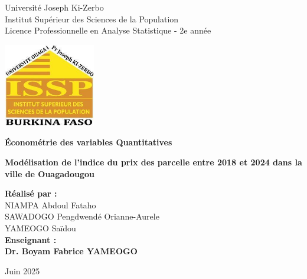 \begin{titlepage}
    \centering
    \vspace{1.5cm}
    {\Large Université Joseph Ki-Zerbo \\ 
    Institut Supérieur des Sciences de la Population \\ 
    Licence Professionnelle en Analyse Statistique - 2e année \par}
    \vspace{1cm}

    \includegraphics[width=4cm]{logo.jpg}\\
    \vspace{1cm}
    {\Huge\bfseries Économétrie des variables Quantitatives \par}
    \vspace{1cm}
    {\Huge\bfseries\textcolor{BrickRed}{Modélisation de l'indice du prix des parcelle entre 2018 et 2024 dans la ville de Ouagadougou} \par}
    \vspace{1cm}
    \begin{flushleft}
        {\Large
        \textbf{Réalisé par :} \\
        NIAMPA Abdoul Fataho \\
        SAWADOGO Pengdwendé Orianne-Aurele \\
        YAMEOGO Saïdou \\
        \vspace{1cm}
        \textbf{Enseignant :} \\
        \textbf{Dr. Boyam Fabrice YAMEOGO}
        }
    \end{flushleft}
    \vfill
    \centering
    Juin 2025
\end{titlepage}
